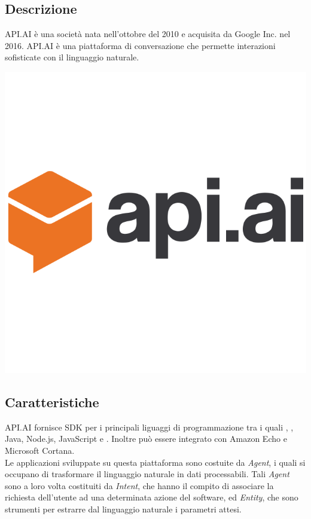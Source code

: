 \documentclass[a4paper,titlepage]{article}
\begin{document}
	\subsection{Descrizione}
	\begin{minipage}{0.7\textwidth}\raggedright
		API.AI è una società nata nell'ottobre del 2010 e acquisita da Google Inc. nel 2016.
		API.AI è una piattaforma di conversazione che permette interazioni sofisticate con il linguaggio naturale.
	\end{minipage}
	\hfill
	\noindent\begin{minipage}{0.1\textwidth}
		\includegraphics[scale=0.15]{images/apiai.png}
	\end{minipage}
	\subsection{Caratteristiche}
	API.AI fornisce SDK per i principali liguaggi di programmazione tra i quali , , Java, Node.js, JavaScript e . Inoltre può essere integrato con Amazon Echo e Microsoft Cortana.\\
	Le applicazioni sviluppate su questa piattaforma sono costuite da \textit{Agent}, i quali si occupano di trasformare il linguaggio naturale in dati processabili.
	Tali \textit{Agent} sono a loro volta costituiti da \textit{Intent}, che hanno il compito di associare la richiesta dell'utente ad una determinata azione del software, ed \textit{Entity}, che sono strumenti per estrarre dal linguaggio naturale i parametri attesi.\\
	
\end{document}
